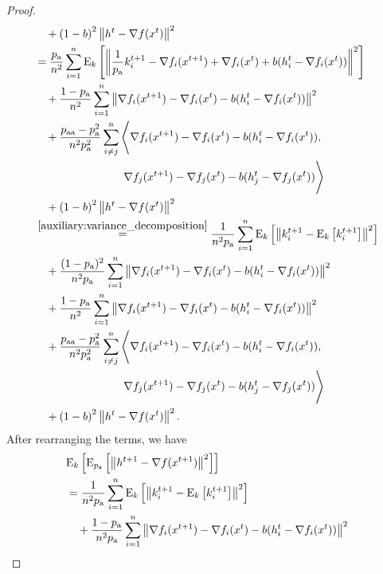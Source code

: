 \documentclass{article}
\newcommand*{\probavailable}{\ensuremath{p_{\textnormal{a}}}}
\newcommand*{\probpairaa}{\ensuremath{p_{\textnormal{aa}}}}
\begin{document}
\begin{proof}
\begin{align*}
    &\quad + \left(1 - b\right)^2 \norm{h^{t} - \nabla f(x^{t})}^2 \\
    &=\frac{\probavailable}{n^2}\sum_{i=1}^n \ExpSub{k}{\norm{\frac{1}{\probavailable}k^{t+1}_i - \nabla f_i(x^{t+1}) + \nabla f_i(x^{t}) + b(h^t_i - \nabla f_i(x^{t}))}^2} \\
    &\quad + \frac{1 - \probavailable}{n^2}\sum_{i=1}^n \norm{\nabla f_i(x^{t+1}) - \nabla f_i(x^{t}) - b(h^t_i - \nabla f_i(x^{t}))}^2 \\
    &\quad +\frac{\probpairaa - \probavailable^2}{n^2 \probavailable^2}\sum_{i \neq j}^n\Bigg\langle \nabla f_i(x^{t+1}) - \nabla f_i(x^{t}) - b(h^t_i - \nabla f_i(x^{t})), \\
    &\qquad\qquad\qquad\qquad \nabla f_j(x^{t+1}) - \nabla f_j(x^{t}) - b(h^t_j - \nabla f_j(x^{t}))\Bigg\rangle \\
    &\quad + \left(1 - b\right)^2 \norm{h^{t} - \nabla f(x^{t})}^2 \\
    &\overset{\eqref{auxiliary:variance_decomposition}}{=}\frac{1}{n^2 \probavailable}\sum_{i=1}^n \ExpSub{k}{\norm{k^{t+1}_i - \ExpSub{k}{k^{t+1}_i}}^2} \\
    &\quad + \frac{(1 - \probavailable)^2}{n^2 \probavailable}\sum_{i=1}^n \norm{\nabla f_i(x^{t+1}) - \nabla f_i(x^{t}) - b(h^t_i - \nabla f_i(x^{t}))}^2 \\
    &\quad + \frac{1 - \probavailable}{n^2}\sum_{i=1}^n \norm{\nabla f_i(x^{t+1}) - \nabla f_i(x^{t}) - b(h^t_i - \nabla f_i(x^{t}))}^2 \\
    &\quad +\frac{\probpairaa - \probavailable^2}{n^2 \probavailable^2}\sum_{i \neq j}^n\Bigg\langle \nabla f_i(x^{t+1}) - \nabla f_i(x^{t}) - b(h^t_i - \nabla f_i(x^{t})), \\
    &\qquad\qquad\qquad\qquad \nabla f_j(x^{t+1}) - \nabla f_j(x^{t}) - b(h^t_j - \nabla f_j(x^{t}))\Bigg\rangle \\
    &\quad + \left(1 - b\right)^2 \norm{h^{t} - \nabla f(x^{t})}^2. \\
  \end{align*}
  After rearranging the terms, we have
  \begin{align*}
    &\ExpSub{k}{\ExpSub{\probavailable}{\norm{h^{t+1} - \nabla f(x^{t+1})}^2}} \\
    &=\frac{1}{n^2 \probavailable}\sum_{i=1}^n \ExpSub{k}{\norm{k^{t+1}_i - \ExpSub{k}{k^{t+1}_i}}^2} \\
    &\quad + \frac{1 - \probavailable}{n^2 \probavailable}\sum_{i=1}^n \norm{\nabla f_i(x^{t+1}) - \nabla f_i(x^{t}) - b(h^t_i - \nabla f_i(x^{t}))}^2 \\

\end{align*}
\end{proof}
\end{document}
